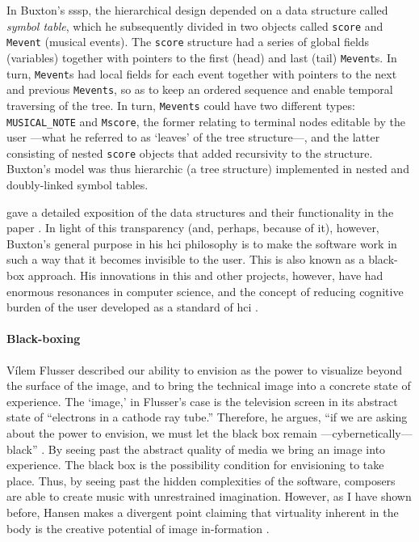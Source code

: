 	In Buxton's \gls{sssp}, the hierarchical design depended on a data structure called \textit{symbol table}, which he subsequently divided in two objects called \texttt{score} and \texttt{Mevent} (musical events). The \texttt{score} structure had a series of global fields (variables) together with pointers to the first (head) and last (tail) \texttt{Mevent}s. In turn, \texttt{Mevent}s had local fields for each event together with pointers to the next and previous \texttt{Mevents}, so as to keep an ordered sequence  and enable temporal traversing of the tree. In turn, \texttt{Mevents} could have two different types: \texttt{MUSICAL\_NOTE} and \texttt{Mscore}, the former relating to terminal nodes editable by the user ---what he referred to as `leaves' of the tree structure---, and the latter consisting of nested \texttt{score} objects that added recursivity to the structure. Buxton's model was thus hierarchic (a tree structure) implemented in nested and doubly-linked symbol tables.

	\citeauthor{icmc/bbp2372.1978.012} gave a detailed exposition of the data structures and their functionality in the paper \parencite{icmc/bbp2372.1978.012} . In light of this transparency (and, perhaps, because of it), however, Buxton's general purpose in his \gls{hci} philosophy is to make the software work in such a way that it becomes invisible to the user. This is also known as a black-box approach. His innovations in this and other projects, however, have had enormous resonances in computer science, and the concept of reducing cognitive burden of the user developed as a standard of \gls{hci} \parencite{youtube/buxton16}.

	\paragraph{Black-boxing}

	Vílem Flusser \parencite{Flu11:Int} described our ability to envision as the power to visualize beyond the surface of the image, and to bring the technical image into a concrete state of experience. The `image,' in Flusser's case is the television screen in its abstract state of ``electrons in a cathode ray tube.'' Therefore, he argues, ``if we are asking about the power to envision, we must let the black box remain ---cybernetically--- black'' \parencite[35]{Flu11:Int}. By seeing past the abstract quality of media we bring an image into experience. The black box is the possibility condition for envisioning to take place. Thus, by seeing past the hidden complexities of the software, composers are able to create music with unrestrained imagination. However, as I have shown before, Hansen makes a divergent point claiming that virtuality inherent in the body is the creative potential of image in-formation . 

